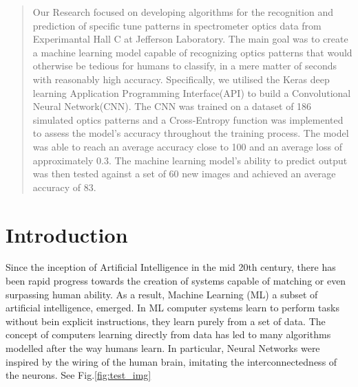 \documentclass[conference]{IEEEtran}
\begin{document}
\begin{abstract}
Our Research focused on developing algorithms for the recognition and prediction of specific tune patterns in spectrometer optics data from Experimantal Hall C at Jefferson Laboratory. The main goal was to create a machine learning model capable of recognizing optics patterns that would otherwise be tedious for humans to classify, in a mere matter of seconds with reasonably high accuracy. Specifically, we utilised the Keras deep learning Application Programming Interface(API) to build a Convolutional Neural Network(CNN). The CNN was trained on a dataset of 186 simulated optics patterns and a Cross-Entropy function was implemented to assess the model's accuracy throughout the training process. The model was able to reach an average accuracy close to 100\text{\%} and an average loss of approximately 0.3. The machine learning model's ability to predict output was then tested against a set of 60 new images and achieved an average accuracy of 83\text{\%}.  
\end{abstract}


\section{Introduction}
Since the inception of Artificial Intelligence in the mid 20th century, there has been rapid progress towards the creation of systems capable of matching or even surpassing human ability. As a result, Machine Learning (ML) a subset of artificial intelligence, emerged. In ML computer systems learn to perform tasks without bein explicit instructions, they learn purely from a set of data. The concept of computers learning directly from data has led to many algorithms modelled after the way humans learn. In particular, Neural Networks were inspired by the wiring of the human brain, imitating the interconnectedness of the neurons.
 See Fig.\ref{fig:test_img}
\cite{NNPart1_VZ_2019}
\end{document}
